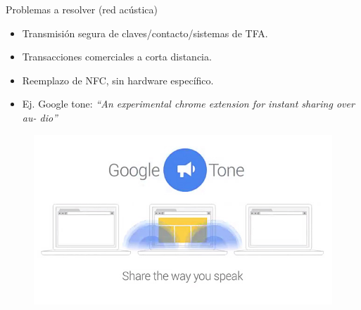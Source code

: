 \documentclass[aspectratio=169]{beamer}
\begin{document}
\begin{frame}{Problemas a resolver (red acústica)}

\begin{itemize}
 \item Transmisión segura de claves/contacto/sistemas de TFA.
 \item Transacciones comerciales a corta distancia.
 \item Reemplazo de NFC, sin hardware específico.
 \item Ej. Google tone: \textit{``An experimental chrome extension for instant sharing over au-
dio''}
 \end{itemize}
 
 \begin{figure}[t]
  \centering
  \includegraphics[width=0.65 \textwidth]{graphs/google_tone.jpg} 
\end{figure}
\end{frame}


\end{document}
